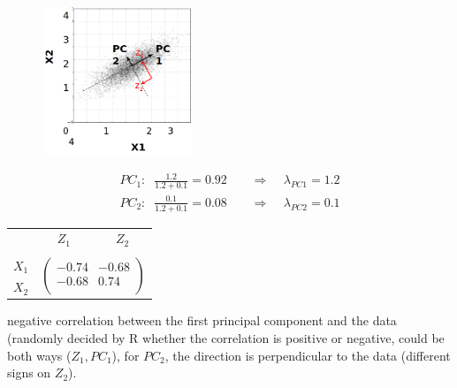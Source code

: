 \documentclass{article}
\begin{document}
\begin{figure}
\begin{center}
\includegraphics[width = 0.4\textwidth]{PCA/PCA_components.png}
\end{center}
\end{figure}

\begin{align*}
    PC_1: \;\;	\frac{1.2}{1.2+0.1} = 0.92	\; \; \; \; & \Rightarrow \; \; \;\; \lambda_{PC1} = 1.2 \\
	PC_2: \;\;	\frac{0.1}{1.2+0.1} = 0.08  \; \; \; \; & \Rightarrow \;\; \; \; \lambda_{PC2} = 0.1
\end{align*}

\begin{table}
\centering
    \begin{tabular}{c c c}
         & $Z_1$ & $Z_2$ \\
         & & \\
         $X_1$ & \multicolumn{2}{c}{\multirow{2}{*}{$\begin{pmatrix}
                                                    -0.74 & -0.68\\
                                                    -0.68 & 0.74\\
                                                    \end{pmatrix}$}}\\
         $X_2$ & \multicolumn{2}{c}{}\\

    \end{tabular}
\end{table}
negative correlation between the first principal component and the data (randomly decided by R whether the correlation is positive or negative, could be both ways ($Z_1, PC_1$), for $PC_2$, the direction is perpendicular to the data (different signs on $Z_2$).
\end{document}
